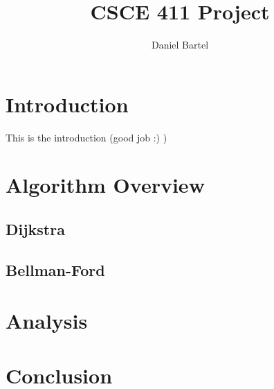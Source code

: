 \documentclass{article}
\title{CSCE 411 Project}
\author{Daniel Bartel}
\date{}
\begin{document}
  \maketitle
  \section*{Introduction}
  This is the introduction (good job :) )
  \section*{Algorithm Overview}
    \subsection*{Dijkstra}
    \subsection*{Bellman-Ford}
  \section*{Analysis}
  \section*{Conclusion}
\end{document}
